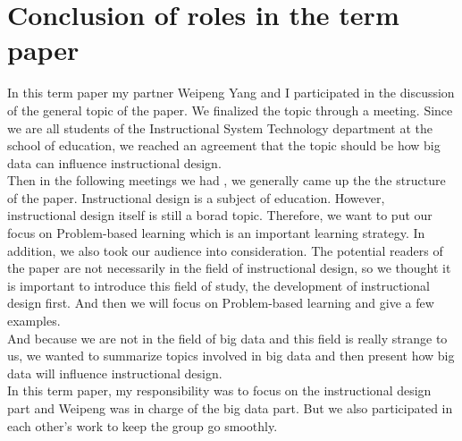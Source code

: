 \documentclass[sigconf]{acmart}
\begin{document}
\appendix


\section{Conclusion of roles in the term paper}

In this term paper my partner Weipeng Yang and I participated in the  discussion of the general topic of the paper. We finalized the topic through a meeting. Since we are all students of the Instructional System Technology department at the school of education, we reached an agreement that the topic should be how big data can influence instructional design.\\

Then in the following meetings we had , we generally came up the the structure of the paper. Instructional design is a subject of education. However, instructional design itself is still a borad topic. Therefore, we want to put our focus on Problem-based learning which is an important learning strategy. In addition, we also took our audience into consideration. The potential readers of the paper are not necessarily in the field of instructional design, so we thought it is important to introduce this field of study, the development of instructional design first. And then we will focus on Problem-based learning and give a few examples.\\

And because we are not in the field of big data and this field is really strange to us, we wanted to summarize topics involved in big data and then present how big data will influence instructional design.\\

In this term paper, my responsibility was to focus on the instructional design part and Weipeng was in charge of the big data part. But we also participated in each other's work to keep the group go smoothly. \\











 
\end{document}
